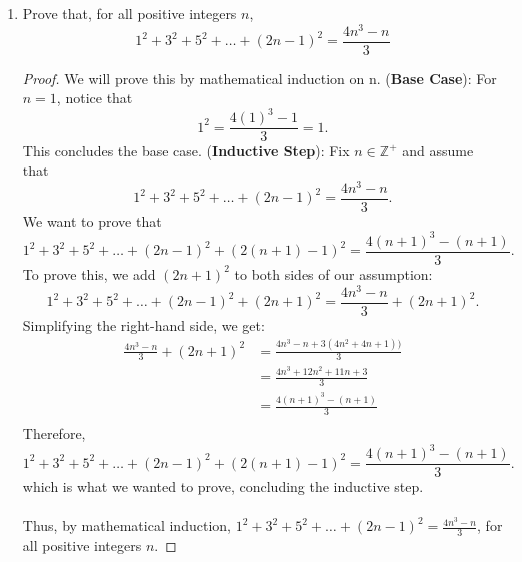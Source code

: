 \documentclass{article}
\begin{document}
\begin{enumerate}
    	\item Prove that, for all positive integers $n$,
    		\[
    			1^2 + 3^2 + 5^2 + \dots + (2n-1)^2 = \frac{4n^3-n}{3}
    		\]
                \begin{proof}
                    We will prove this by mathematical induction on n.
                    \ppar (\textbf{Base Case}): For $n = 1$, notice that 
                        \[
                            1^2 = \frac{4(1)^3 - 1}{3} = 1.
                        \]
                    This concludes the base case.
                    \ppar (\textbf{Inductive Step}): Fix $n\in\mathbb{Z}^+$ and assume that 
                        \[
    			             1^2 + 3^2 + 5^2 + \dots + (2n - 1)^2 = \frac{4n^3 - n}{3}.
    		          \]
                    \ppar We want to prove that
                        \[
    			             1^2 + 3^2 + 5^2 + \dots + (2n - 1)^2 + (2(n + 1) - 1)^2 = \frac{4(n + 1)^3 - (n + 1)}{3}.
    		          \]
                    \ppar To prove this, we add $(2n + 1)^2$ to both sides of our assumption:
                        \[
    			             1^2 + 3^2 + 5^2 + \dots + (2n - 1)^2 + (2n + 1)^2 = \frac{4n^3 - n}{3} + (2n + 1)^2.
    		          \]
                    \ppar Simplifying the right-hand side, we get:
                        \begin{align*}
    			        \frac{4n^3 - n}{3} + (2n + 1)^2 &= \frac{4n^3 - n + 3(4n^2 + 4n + 1))}{3} \\
                            &= \frac{4n^3 + 12n^2 + 11n + 3}{3} \\
                            &= \frac{4(n + 1)^3 - (n + 1)}{3} \\
    		          \end{align*}
                    \ppar Therefore, 
                    \[
                        1^2 + 3^2 + 5^2 + \dots + (2n - 1)^2 + (2(n + 1) - 1)^2 = \frac{4(n + 1)^3 - (n + 1)}{3}.
                    \]
                        which is what we wanted to prove, concluding the inductive step.
                    \\\\ Thus, by mathematical induction, $1^2 + 3^2 + 5^2 + \dots + (2n-1)^2 = \frac{4n^3-n}{3}$, for all positive integers $n$.
                \end{proof}


\end{enumerate}
\end{document}
